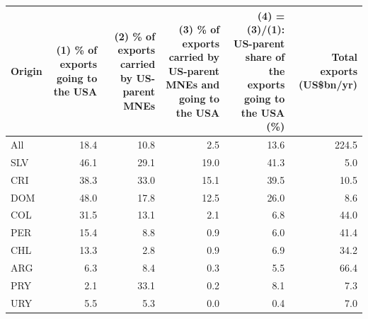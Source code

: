 \begin{tabular}{lrrrrr}
\toprule
Origin & \multicolumn{1}{p{2.3cm}}{\raggedright (1) \% of exports going to the USA} & \multicolumn{1}{p{2.3cm}}{\raggedright (2) \% of exports carried by US-parent MNEs} & \multicolumn{1}{p{2.6cm}}{\raggedright (3) \% of exports carried by US-parent MNEs and going to the USA} & \multicolumn{1}{p{2.6cm}}{\raggedright (4) = (3)/(1): US-parent share of the exports going to the USA (\%)} & \multicolumn{1}{p{1.8cm}}{\raggedright Total exports (US\$bn/yr)} \\
\midrule
All & 18.4 & 10.8 & 2.5 & 13.6 & 224.5 \\
\midrule
SLV & 46.1 & 29.1 & 19.0 & 41.3 & 5.0 \\
CRI & 38.3 & 33.0 & 15.1 & 39.5 & 10.5 \\
DOM & 48.0 & 17.8 & 12.5 & 26.0 & 8.6 \\
COL & 31.5 & 13.1 & 2.1 & 6.8 & 44.0 \\
PER & 15.4 & 8.8 & 0.9 & 6.0 & 41.4 \\
CHL & 13.3 & 2.8 & 0.9 & 6.9 & 34.2 \\
ARG & 6.3 & 8.4 & 0.3 & 5.5 & 66.4 \\
PRY & 2.1 & 33.1 & 0.2 & 8.1 & 7.3 \\
URY & 5.5 & 5.3 & 0.0 & 0.4 & 7.0 \\
\bottomrule
\end{tabular}
